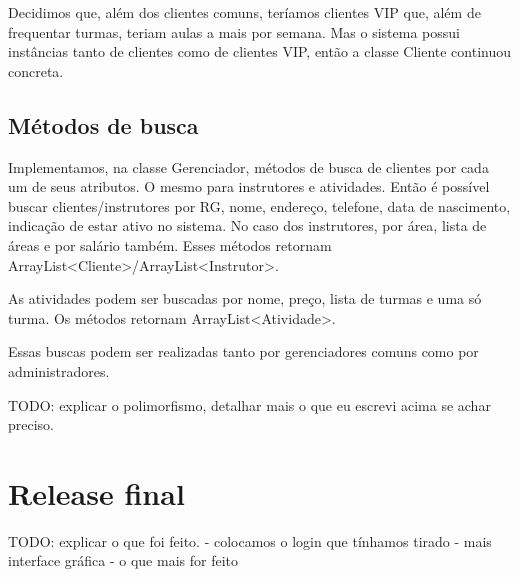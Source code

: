 \documentclass[11pt,twoside]{article}
\begin{document}
Decidimos que, além dos clientes comuns, teríamos clientes VIP que, além de frequentar turmas, teriam aulas a mais por semana. Mas o sistema
possui instâncias tanto de clientes como de clientes VIP, então a classe Cliente continuou concreta.

\subsection{Métodos de busca}
Implementamos, na classe Gerenciador, métodos de busca de clientes por cada um de seus atributos. O mesmo para instrutores e atividades.
Então é possível buscar clientes/instrutores por RG, nome, endereço, telefone, data de nascimento, indicação de estar ativo no sistema. No caso
dos instrutores, por área, lista de áreas e por salário também. Esses métodos retornam ArrayList<Cliente>/ArrayList<Instrutor>.

As atividades podem ser buscadas por nome, preço, lista de turmas e uma só turma. Os métodos retornam ArrayList<Atividade>.

Essas buscas podem ser realizadas tanto por gerenciadores comuns como por administradores.

{\color{red}
TODO: explicar o polimorfismo, detalhar mais o que eu escrevi acima se achar preciso.
}

\section{Release final}
{\color{red}
TODO: explicar o que foi feito.
- colocamos o login que tínhamos tirado
- mais interface gráfica
- o que mais for feito
}
\end{document}
